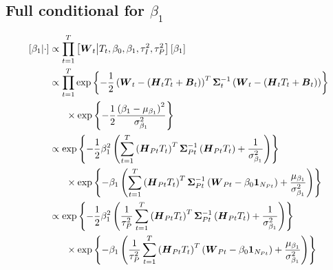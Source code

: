 \documentclass{article}\usepackage[]{graphicx}\usepackage[]{color}
\def\bm#1{\mbox{\boldmath $#1$}}
\begin{document}
\subsection{Full conditional for $\beta_1$}
%
\begin{align*}
%
\left[ \beta_1 \middle| \cdot \right] & \propto \prod_{t = 1}^T \left[ \bm{W}_t \middle| T_t, \beta_0, \beta_1, \tau^2_I, \tau^2_P \right] \left[ \beta_1 \right]\\
%
& \propto \prod_{t = 1}^T \exp{ \left\{ - \frac{1} {2} \left( \bm{W}_t - \left( \bm{H}_t T_t + \bm{B}_t \right) \right)^T \bm{\Sigma}_t^{ - 1} \left( \bm{W}_t - \left( \bm{H}_t T_t + \bm{B}_t \right) \right) \right\} }\\
& \hspace{6mm} \times \exp{ \left\{ - \frac{1} {2} \frac{\left( \beta_1 - \mu_{\beta_1} \right)^2} {\sigma^2_{\beta_1}} \right\} }\\
%
& \propto \exp{ \left\{ - \frac{1} {2} \beta_1^2 \left( \sum_{t = 1}^T \left( \bm{H}_{Pt} T_t \right)^T \bm{\Sigma}_{Pt}^{ - 1} \left( \bm{H}_{Pt} T_t \right) + \frac{1} {\sigma^2_{\beta_1}} \right) \right\} }\\
& \hspace{6mm} \times \exp{ \left\{ - \beta_1 \left( \sum_{t = 1}^T \left( \bm{H}_{Pt} T_t \right)^T \bm{\Sigma}_{Pt}^{ - 1} \left( \bm{W}_{Pt} - \beta_0 \bm{1}_{N_{Pt}} \right) + \frac{\mu_{\beta_1}} {\sigma^2_{\beta_1}} \right) \right\} }\\
%
& \propto \exp{ \left\{ - \frac{1} {2} \beta_1^2 \left( \frac{1} {\tau^2_P} \sum_{t = 1}^T \left( \bm{H}_{Pt} T_t \right)^T \bm{\Sigma}_{Pt}^{ - 1} \left( \bm{H}_{Pt} T_t \right) + \frac{1} {\sigma^2_{\beta_1}} \right) \right\} }\\
& \hspace{6mm} \times \exp{ \left\{ - \beta_1 \left( \frac{1} {\tau^2_P} \sum_{t = 1}^T \left( \bm{H}_{Pt} T_t \right)^T \left( \bm{W}_{Pt} - \beta_0 \bm{1}_{N_{Pt}} \right) + \frac{\mu_{\beta_1}} {\sigma^2_{\beta_1}} \right) \right\} }\\
%
\end{align*}
%
\end{document}
